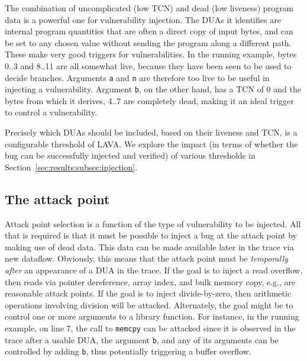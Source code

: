 
The combination of uncomplicated (low TCN) and dead (low liveness) program data is a powerful one for vulnerability injection.
The DUAs it identifies are internal program quantities that are often a direct copy of input bytes, and can be set to any chosen value without sending the program along a different path.  
These make very good triggers for vulnerabilities.
In the running example, bytes 0..3 and 8..11 are all somewhat live, because they have been seen to be used to decide branches.
Arguments \verb+a+ and \verb+n+ are therefore too live to be useful in injecting a vulnerability.
Argument \verb+b+, on the other hand, has a TCN of 0 and the bytes from which it derives, 4..7 are completely dead, 
making it an ideal trigger to control a vulnerability. 

Precisely which DUAs should be included, based on their liveness and TCN, is a configurable threshold of LAVA.
We explore the impact (in terms of whether the bug can be successfully injected and verified) of various thresholds in Section~\ref{sec:results:subsec:injection}.

\subsection {The attack point}

Attack point selection is a function of the type of vulnerability to be injected.
All that is required is that it must be possible to inject a bug at the attack point by making use of dead data.
This data can be made available later in the trace via new dataflow.
Obviously, this means that the attack point must be \emph{temporally after} an appearance of a DUA in the trace.
If the goal is to inject a read overflow, then reads via pointer dereference, array index, and bulk memory copy, e.g., are reasonable attack points.  
If the goal is to inject divide-by-zero, then arithmetic operations involving division will be attacked. 
Alternately, the goal might be to control one or more arguments to a library function.
For instance, in the running example, on line 7, the call to \verb+memcpy+ can be attacked since it is observed in the trace after a usable DUA, the argument \verb+b+, and any of its arguments can be controlled by adding \verb+b+, thus potentially triggering a buffer overflow. 

